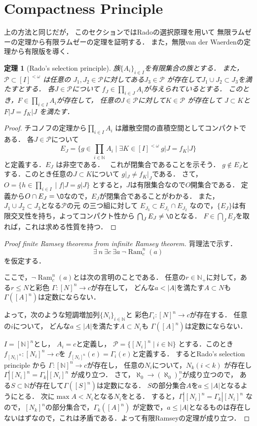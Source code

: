 \documentclass[leqno, 12pt]{jsarticle}
\newtheorem{thm}{定理}
\newcommand{\nn}{\mathbb{N}}
\DeclareMathOperator{\ram}{Ram}
\begin{document}
\section{Compactness Principle}
上の方法と同じだが，
このセクションではRadoの選択原理を用いて
無限ラムゼーの定理から有限ラムゼーの定理を証明する．
また，無限van der Waerdenの定理から有限版を導く．
\begin{thm}[Rado's selection principle]
族$\{A_i\}_{i\in I}$を有限集合の族とする．
また，$\mathcal{P}\subset  [I]^{<\omega}$
は任意の
$J_1, J_2\in \mathcal{P}$に対してある$J_3\in \mathcal{P}$
が存在して$J_1\cup J_2 \subset J_3$を満たすとする．
各$J\in  \mathcal{P}$について
$f_J\in \prod_{i\in J}A_i$が与えられているとする．
このとき，$F\in \prod_{i\in I}A_i$が存在して，
任意の$J\in \mathcal{P}$に対して$K\in \mathcal{P}$
が存在して
$J\subset K$と$F|J=f_K|J$
を満たす．
\end{thm}
\begin{proof}
チコノフの定理から$\prod_{i\in I}A_i$
は離散空間の直積空間としてコンパクトである．
各$J\in \mathcal{P}$について
\[
E_J=\{
g\in \prod_{i\in \nn}A_i\mid \exists K\in [I]^{<\omega}\ 
g|J=f_K|J
\}
\]
と定義する．$E_J$
は非空である．　
これが閉集合であることを示そう．
$g\not\in E_J$とする．このとき任意の$J\subset K$について
$g|_J\neq f_K|_J$である．
さて，$O=\{h\in \prod_{i\in I}\mid f|J=g|J\}$
とすると，$J$は有限集合なので$O$開集合である．
定義から$O\cap E_J=\O$なので，$E_J$が閉集合であることがわかる．
また，$J_1\cup J_2 \subset J_3$となる$\mathcal{P}$の元
の三つ組に対して
$E_{ J_3}\subset E_{J_1}\cap E_{J_2}$
なので，$\{E_J\}$は有限交叉性を持ち，よってコンパクト性から
$\bigcap_JE_J\neq \O$となる．
$F\in \bigcap_J E_J$を取れば，これは求める性質を持つ．

\end{proof}

\begin{proof}[Proof  finite Ramsey theorems from infinite Ramsey theorem]
背理法で示す．
\[
\exists\ n\ \exists c\ \exists a\ \lnot \ram_c^n(a)
\]
を仮定する．

ここで，$\lnot \ram_c^n(a)$とは次の言明のことである．
任意の$r\in \nn_+$に対して，ある$r\le N$と彩色
$\Gamma:[N]^n\to c$が存在して，
どんな$a<|A|$を満たす$A\subset N$も
$\Gamma([A]^n)$は定数にならない．

よって，次のような短調増加列$\{N_i\}_{i\in \nn}$と
彩色$\Gamma_i:[N]^n\to c$が存在する．
任意の$i$について，
どんな$a\le |A|$を満たす$A\subset N_i$も
$\Gamma([A]^n)$は定数にならない．

$I=[\nn]^n$とし，
$A_i=c$と定義し，
$\mathcal{P}=\{[N_i]^n\mid i\in \nn\}$
とする．このとき
$f_{[N_i]^n}: [N_i]^n\to c$を
$f_{[N_i]^n}(e)=\Gamma_{i}(e)$と定義する．
するとRado's selection principle から
$\Gamma:[\nn]^n\to c$が存在し，
任意の$N_i$について，$N_k (i<k)$
が存在し$\Gamma|[N_i]^n=\Gamma_k|[N_i]^n$
が成り立つ．
さて，$\aleph_0\to (\aleph_0)_c^n$が成り立つので，
ある$S\subset \nn$が存在して$\Gamma([S]^n)$は定数になる．
$S$の部分集合$A$を$a\le |A|$となるようにとる．
次に$\max A< N_i$となる$N_i$をとる．
すると，$\Gamma|[N_i]^n=\Gamma_k|[N_i]^n$
なので，$[N_k]^n$の部分集合で，$\Gamma_k([A]^n)$
が定数で，$a\le |A|$となるものは存在しないはずなので，これは矛盾である．よって有限Ramseyの定理が成り立つ．
\end{proof}
\end{document}

